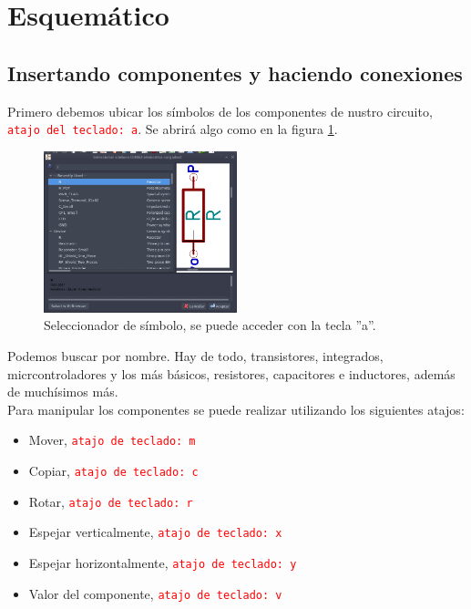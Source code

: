 \section{Esquemático}

\subsection{Insertando componentes y haciendo conexiones}

Primero debemos ubicar los símbolos de los componentes de nustro circuito, \textcolor{red}{\texttt{atajo del teclado: a}}. Se abrirá algo como en la figura \ref{fig:seleccionador_de_simbolo}.

\begin{figure}[H]
	\centering
	\includegraphics[width=0.5\textwidth]{imagenes/seleccionador_de_simbolo.png}
	\caption{Seleccionador de símbolo, se puede acceder con la tecla ''a''.}
	\label{fig:seleccionador_de_simbolo}
\end{figure}


Podemos buscar por nombre. Hay de todo, transistores, integrados, micrcontroladores y los más básicos, resistores, capacitores e inductores, además de muchísimos más.\\

Para manipular los componentes se puede realizar utilizando los siguientes atajos:
\begin{itemize}
	\item Mover, \textcolor{red}{\texttt{atajo de teclado: m}}
	\item Copiar, \textcolor{red}{\texttt{atajo de teclado: c}}
	\item Rotar, \textcolor{red}{\texttt{atajo de teclado: r}}
	\item Espejar verticalmente, \textcolor{red}{\texttt{atajo de teclado: x}}
	\item Espejar horizontalmente, \textcolor{red}{\texttt{atajo de teclado: y}}
	\item Valor del componente, \textcolor{red}{\texttt{atajo de teclado: v}}
\end{itemize}

